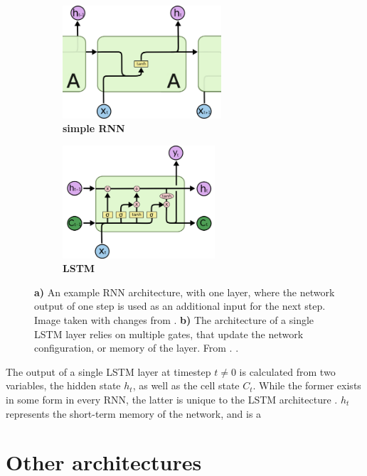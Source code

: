 \begin{figure}
	\centering
	\begin{subfigure}[h]{0.45\linewidth}
	\includegraphics[height=4.2cm]{imgs/simple_RNN.png}
	\caption{\textbf{simple RNN}\label{fig:simple-RNN}}
	\end{subfigure}
	\hfill
	\begin{subfigure}[h]{0.45\linewidth}
	\includegraphics[height=4.2cm]{imgs/LSTM.png}
	\caption{\textbf{LSTM}\label{fig:LSTM}}
	\end{subfigure}
	\caption*{\textbf{a)} An example RNN architecture, with one layer, where the network output of one step is used as an additional input for the next step. 
	Image taken with changes from \cite{NN-images}. \textbf{b)} The architecture of a single LSTM layer relies on multiple gates, that update the network
	configuration, or memory of the layer. From \cite{NN-images}. \label{fig:NN-architectures}.}
\end{figure}

The output of a single LSTM layer at timestep $t\neq0$ is calculated from two variables, the hidden state $h_t$, as well as the cell state $C_t$. While the former
exists in some form in every RNN, the latter is unique to the LSTM architecture \cite{gers2000learning}. $h_t$ represents the short-term memory of the network, and
is a

\section{Other architectures}
\label{sec:NN-other}
